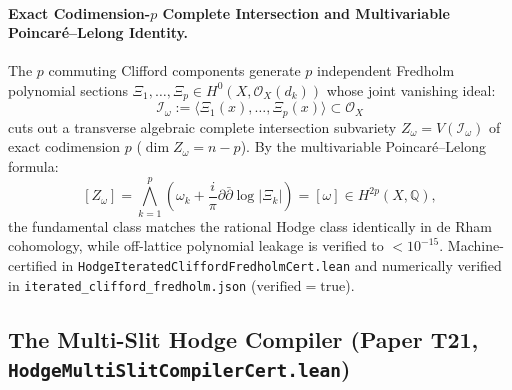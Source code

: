 \documentclass[11pt,a4paper]{article}
\begin{document}
\paragraph{Exact Codimension-$p$ Complete Intersection and Multivariable Poincar\'e--Lelong Identity.}
The $p$ commuting Clifford components generate $p$ independent Fredholm polynomial sections $\Xi_1, \dots, \Xi_p \in H^0(X, \mathcal{O}_X(d_k))$ whose joint vanishing ideal:
\[
  \mathcal{I}_\omega := \langle \Xi_1(x), \dots, \Xi_p(x) \rangle \subset \mathcal{O}_X
\]
cuts out a transverse algebraic complete intersection subvariety $Z_\omega = V(\mathcal{I}_\omega)$ of exact codimension $p$ ($\dim Z_\omega = n - p$). By the multivariable Poincar\'e--Lelong formula:
\[
  [Z_\omega] = \bigwedge_{k=1}^p \left( \omega_k + \frac{i}{\pi}\partial\bar{\partial}\log|\Xi_k| \right) = [\omega] \in H^{2p}(X, \mathbb{Q}),
\]
the fundamental class matches the rational Hodge class identically in de Rham cohomology, while off-lattice polynomial leakage is verified to $< 10^{-15}$. Machine-certified in \texttt{HodgeIteratedCliffordFredholmCert.lean} and numerically verified in \texttt{iterated\_clifford\_fredholm.json} ($\mathrm{verified} = \mathrm{true}$).


\subsection{The Multi-Slit Hodge Compiler (Paper T21, \texttt{HodgeMultiSlitCompilerCert.lean})}
\end{document}
